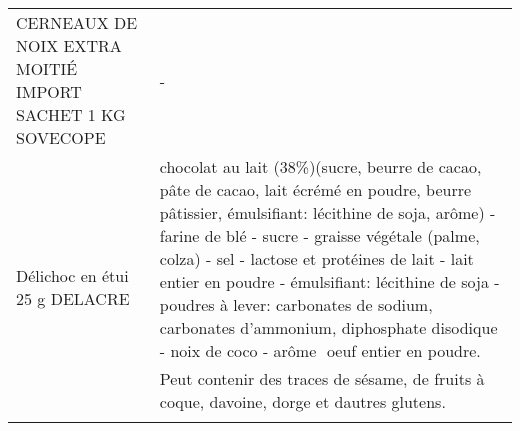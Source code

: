 \begin{longtable}{p{5cm}p{10cm}}
                                                CERNEAUX DE NOIX EXTRA MOITIÉ IMPORT SACHET 1 KG SOVECOPE &                                                                                                                                                                                                                                                                                                                                                                                                                                                                                                                                                                                                                                                                                                                                                                                                                                                                                                                                                                                                                                        - \\
                                                                            Délichoc en étui 25 g DELACRE &                                                                                                                                                                                                                                                                                                                                                                                                                                                                                                chocolat au lait (38\%)(sucre, beurre de cacao, pâte de cacao, lait écrémé en poudre, beurre pâtissier, émulsifiant: lécithine de soja, arôme) - farine de blé - sucre - graisse végétale (palme, colza) - sel - lactose et protéines de lait - lait entier en poudre - émulsifiant: lécithine de soja - poudres à lever: carbonates de sodium, carbonates d'ammonium, diphosphate disodique - noix de coco - arôme  oeuf entier en poudre.  Peut contenir des traces de sésame, de fruits à coque, davoine, dorge et dautres glutens. \\

\end{longtable}
